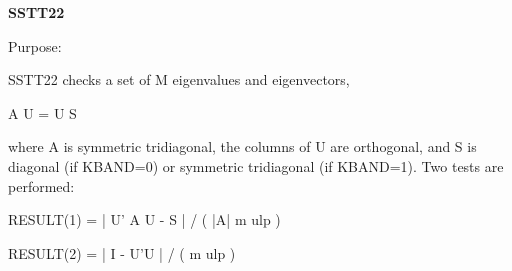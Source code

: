 {\bfseries S\+S\+T\+T22} 

\begin{DoxyParagraph}{Purpose\+: }
\begin{DoxyVerb} SSTT22  checks a set of M eigenvalues and eigenvectors,

     A U = U S

 where A is symmetric tridiagonal, the columns of U are orthogonal,
 and S is diagonal (if KBAND=0) or symmetric tridiagonal (if KBAND=1).
 Two tests are performed:

    RESULT(1) = | U' A U - S | / ( |A| m ulp )

    RESULT(2) = | I - U'U | / ( m ulp )\end{DoxyVerb}
 
\end{DoxyParagraph}

